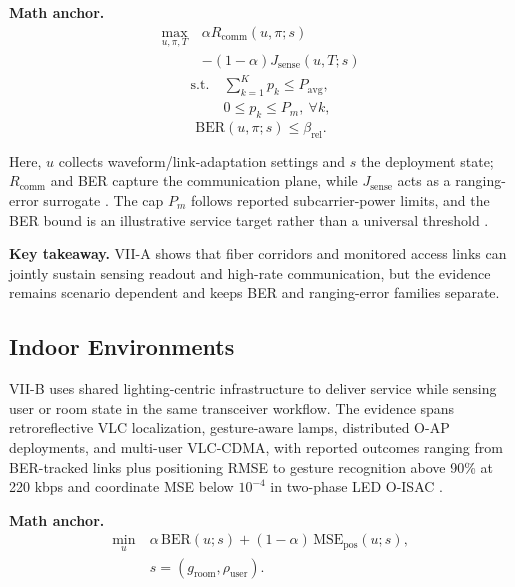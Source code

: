 \documentclass[letterpaper,journal]{IEEEtran}
\begin{document}
\textbf{Math anchor.}
\begin{equation}
    \begin{split}
        \max_{u,\pi,T}\  & \alpha R_{\mathrm{comm}}(u,\pi;s)      \\
                         & - (1-\alpha) J_{\mathrm{sense}}(u,T;s)
    \end{split}
\end{equation}
\begin{equation}
    \begin{split}
        \text{s.t.}\  & \sum_{k=1}^{K} p_k \le P_{\mathrm{avg}}, \\
                      & 0 \le p_k \le P_m,\ \forall k,
    \end{split}
\end{equation}
\begin{equation}
    \mathrm{BER}(u,\pi;s) \le \beta_{\mathrm{rel}}.
\end{equation}

Here, $u$ collects waveform/link-adaptation settings and $s$ the deployment state; $R_{\mathrm{comm}}$ and BER capture the communication plane, while $J_{\mathrm{sense}}$ acts as a ranging-error surrogate \cite{O_ISAC_034,O_ISAC_048}. The cap $P_m$ follows reported subcarrier-power limits, and the BER bound is an illustrative service target rather than a universal threshold \cite{O_ISAC_034,O_ISAC_048}.

\textbf{Key takeaway.} VII-A shows that fiber corridors and monitored access links can jointly sustain sensing readout and high-rate communication, but the evidence remains scenario dependent and keeps BER and ranging-error families separate.

\subsection{Indoor Environments}

VII-B uses shared lighting-centric infrastructure to deliver service while sensing user or room state in the same transceiver workflow. The evidence spans retroreflective VLC localization, gesture-aware lamps, distributed O-AP deployments, and multi-user VLC-CDMA, with reported outcomes ranging from BER-tracked links plus positioning RMSE to gesture recognition above 90\% at 220 kbps and coordinate MSE below $10^{-4}$ in two-phase LED O-ISAC \cite{O_ISAC_011,O_ISAC_030,O_ISAC_108,O_ISAC_388}.

\textbf{Math anchor.}
\begin{equation}
    \begin{split}
        \min_{u}\  & \alpha\,\mathrm{BER}(u;s) + (1-\alpha)\,\mathrm{MSE}_{\mathrm{pos}}(u;s), \\
                   & s=(g_{\mathrm{room}},\rho_{\mathrm{user}}).
    \end{split}
\end{equation}
\end{document}
